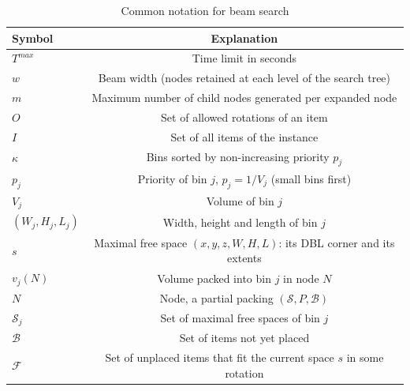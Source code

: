 %

\providecommand{\up}{\rule{0pt}{2.6ex}}
\providecommand{\down}{\rule[-1.2ex]{0pt}{0pt}}
\providecommand{\TABLE}[3]{\caption{#1}#2#3}

\begin{table}[htbp]
\TABLE
{Common notation for beam search \label{tab:BS}}
{\begin{tabular}{@{}l@{\quad}c@{}}
\hline\up
Symbol              & Explanation            \\ \hline\up
$T^{max}$ & Time limit in seconds               \\
$w$ & Beam width (nodes retained at each level of the search tree)               \\
$m$ & Maximum number of child nodes generated per expanded node               \\
$O$ & Set of allowed rotations of an item               \\
$I$ & Set of all items of the instance               \\
$\kappa$ & Bins sorted by non-increasing priority $p_j$               \\
$p_j$ & Priority of bin $j$, $p_j = 1/V_j$ (small bins first)               \\
$V_j$ & Volume of bin $j$               \\
$(W_j, H_j, L_j)$ & Width, height and length of bin $j$               \\
$s$ & Maximal free space $(x,y,z,W,H,L)$: its DBL corner and its extents               \\
$v_j(N)$ & Volume packed into bin $j$ in node $N$               \\
$N$ & Node, a partial packing $(\mathcal{S}, P, \mathcal{B})$               \\
$\mathcal{S}_j$ & Set of maximal free spaces of bin $j$               \\
$\mathcal{B}$ & Set of items not yet placed               \\
$\mathcal{F}$ & Set of unplaced items that fit the current space $s$ in some rotation               \\

\end{tabular}}
\end{table}
